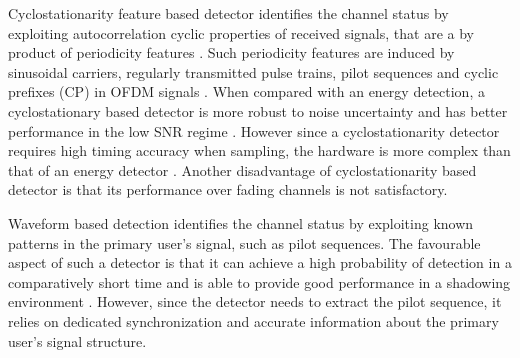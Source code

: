 Cyclostationarity feature based detector identifies the channel status by exploiting autocorrelation cyclic properties of received signals, that are a by product of periodicity features \cite{goldsmith2009breaking}. Such periodicity features are induced by  sinusoidal carriers,  regularly transmitted pulse trains, pilot sequences and cyclic prefixes (CP) in OFDM signals \cite{akyildiz2011cooperative, umar2013comparative}.  
When compared with an energy detection, a cyclostationary based detector is more robust to noise uncertainty and has better performance in the low SNR regime \cite{umar2013comparative}. However since a cyclostationarity detector requires high timing accuracy when sampling, the hardware is more complex than that of an energy detector \cite{yucek2009survey}. Another disadvantage of cyclostationarity based detector is that its performance over fading channels is not satisfactory\cite{tandra2007snr}.   

Waveform based detection identifies the channel status by exploiting known patterns in the primary user's signal, such as pilot sequences. The favourable aspect of such a detector is that it can achieve a high probability of detection in a comparatively short time and is able to provide  good performance in a shadowing environment \cite{tang2005some}. However, since the detector needs to extract the pilot sequence, it relies on dedicated synchronization and accurate information about the primary user's signal structure.  



